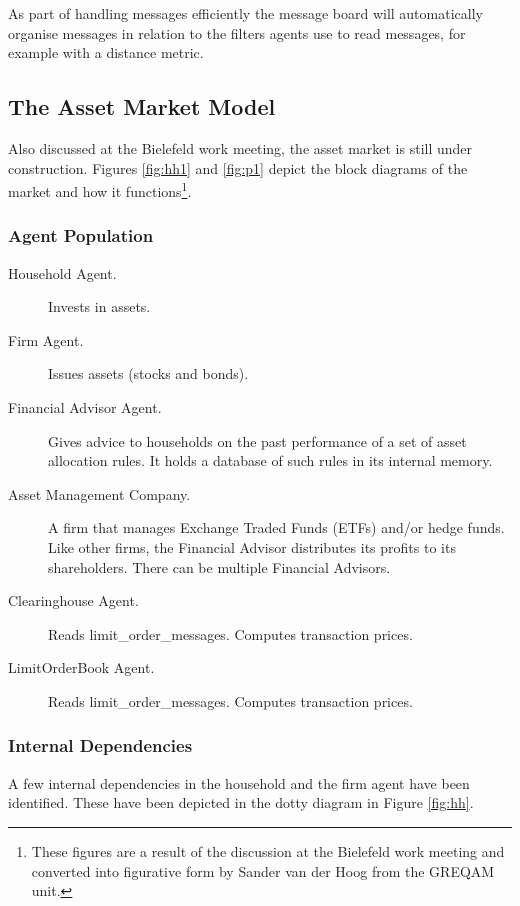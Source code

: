 \documentclass[a4paper,11pt]{article}
\begin{document}
As part of handling messages efficiently the message board will
automatically organise messages in relation to the filters agents
use to read messages, for example with a distance metric.

\subsection{The Asset Market Model}

Also discussed at the Bielefeld work meeting, the asset market is
still under construction. Figures \ref{fig:hh1} and \ref{fig:p1} depict the block diagrams of the
market and how it functions\footnote{These figures are a result of the discussion at the Bielefeld work meeting and converted into figurative form by Sander van der Hoog from the GREQAM unit.}.

\subsubsection{Agent Population}
\begin{description}
\item[Household Agent.] Invests in assets.
\item[Firm Agent.] Issues assets (stocks and bonds).
\item[Financial Advisor Agent.] Gives advice to households on the past performance of a set of asset allocation rules. It holds a database of such rules in its internal memory.
\item[Asset Management Company.] A firm that manages Exchange Traded Funds (ETFs) and/or hedge funds. Like other firms, the Financial Advisor distributes its profits to its shareholders. There can be multiple Financial Advisors.
\item[Clearinghouse Agent.] Reads limit\_order\_messages. Computes transaction prices.
\item[LimitOrderBook Agent.] Reads limit\_order\_messages. Computes transaction prices.
\end{description}

\subsubsection{Internal Dependencies}
A few internal dependencies in the household and the firm agent have
been identified. These have been depicted in the dotty diagram in
Figure \ref{fig:hh}.
\end{document}
